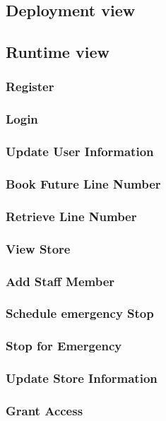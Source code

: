 \subsection{Deployment view}
\subsection{Runtime view}

\subsubsection{Register}
\subsubsection{Login}
\subsubsection{Update User Information}
\subsubsection{Book Future Line Number}
\subsubsection{Retrieve Line Number}
\subsubsection{View Store} %
\subsubsection{Add Staff Member}
\subsubsection{Schedule emergency Stop}
\subsubsection{Stop for Emergency}
\subsubsection{Update Store Information}
\subsubsection{Grant Access}
